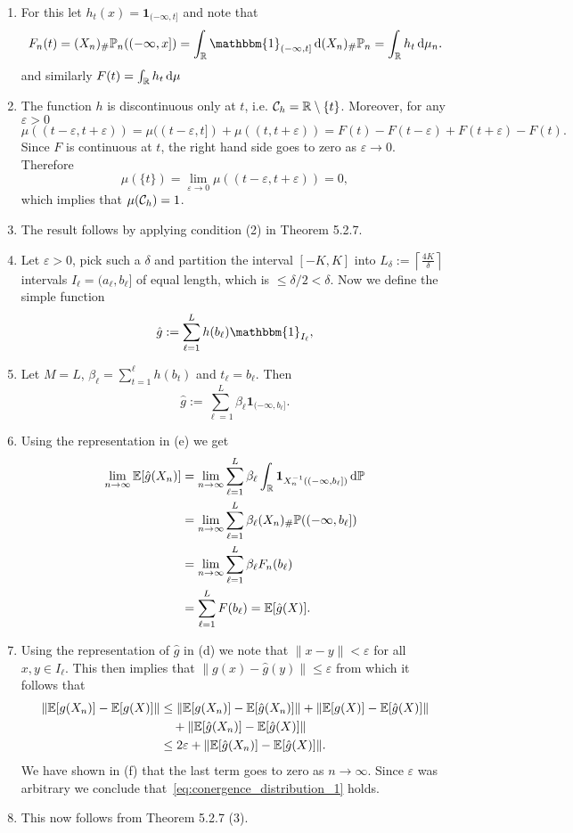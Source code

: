 \begin{enumerate}[label={(\alph*)}]
\item For this let $h_t(x) = \mathbf{1}_{(-\infty,t]}$ and note that 
\[
	F_n(t) = (X_n)_\# \bbP_n ((-\infty,x]) = \int_\bbR \mathbbm{1}_{(-\infty,t]} \, \dd (X_n)_\# \bbP_n
	= \int_\bbR h_t \, \dd \mu_n.
\]
and similarly $F(t) = \int_{\mathbb R} h_t \, \mathrm{d} \mu$
\item The function $h$ is discontinuous only at $t$, i.e. $\mathcal C_h = \mathbb R \setminus \{t\}$. Moreover, for any $\varepsilon > 0$
\[
	\mu((t-\varepsilon, t+\varepsilon)) = \mu((t-\varepsilon,t]) + \mu((t,t+\varepsilon))
	= F(t) - F(t-\varepsilon) + F(t + \varepsilon) - F(t).
\]
Since $F$ is continuous at $t$, the right hand side goes to zero as $\varepsilon \to 0$. Therefore
\[
	\mu(\{t\}) = \lim_{\varepsilon \to 0} \mu((t-\varepsilon, t+\varepsilon)) = 0,
\]
which implies that $\mu(\mathcal C_h) = 1$.
\item The result follows by applying condition (2) in Theorem 5.2.7.
\item Let $\varepsilon > 0$, pick such a $\delta$ and partition the interval $[-K,K]$ into $L_\delta := \left \lceil \frac{4K}{\delta} \right \rceil$ intervals $I_\ell = (a_\ell, b_\ell]$ of equal length, which is $\le \delta/2 < \delta$. Now we define the simple function
\[
	\hat{g} := \sum_{\ell = 1}^L h(b_\ell) \mathbbm{1}_{I_\ell},
\]
\item Let $M=L$, $\beta_\ell = \sum_{t = 1}^\ell h(b_t)$ and $t_\ell = b_\ell$. Then
\[
	\hat{g} := \sum_{\ell = 1}^L \beta_\ell \mathbf{1}_{(-\infty, b_\ell]}.
\]
\item Using the representation in (e) we get
\begin{align*}
	\lim_{n \to \infty} \mathbb E[\hat{g}(X_n)] 
	&= \lim_{n \to \infty} \sum_{\ell = 1}^L \beta_\ell \int_{\mathbb R} \mathbf{1}_{X_n^{-1}((-\infty,b_\ell])} \, \mathrm{d} \mathbb P \\
	&= \lim_{n \to \infty} 	\sum_{\ell = 1}^L \beta_\ell (X_n)_\# \mathbb P ((-\infty, b_\ell]) \\
	&= \lim_{n \to \infty} 	\sum_{\ell = 1}^L \beta_\ell F_n(b_\ell) \\
	&= \sum_{\ell = 1}^L F(b_\ell) = \mathbb E[\hat{g}(X)].
\end{align*}
\item Using the representation of $\hat{g}$ in (d) we note that $\|x - y\| < \varepsilon$ for all $x,y \in I_\ell$. This then implies that $\|g(x) - \hat{g}(y)\| \le \varepsilon$ from which it follows that
\begin{align*}
	\|\mathbb E[g(X_n)] - \mathbb E[g(X)]\| &\le \|\mathbb E[g(X_n)] - \mathbb E[\hat{g}(X_n)]\| 
		+ \|\mathbb E[g(X)] - \mathbb E[\hat{g}(X)]\| \\
	&\hspace{10pt}+ \|\mathbb E[\hat{g}(X_n)] - \mathbb E[\hat{g}(X)]\|\\
	&\le 2\varepsilon + \|\mathbb E[\hat{g}(X_n)] - \mathbb E[\hat{g}(X)]\|.
\end{align*}
We have shown in (f) that the last term goes to zero as $n \to \infty$. Since $\varepsilon$ was arbitrary we conclude that~\eqref{eq:conergence_distribution_1} holds.
\item This now follows from Theorem 5.2.7 (3).
\end{enumerate}





